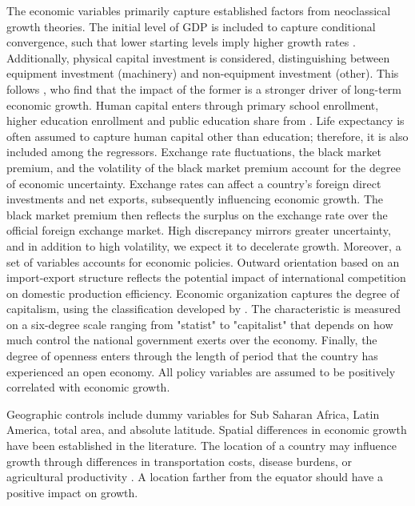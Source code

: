 \begin{subappendices}
The economic variables primarily capture established factors from neoclassical growth theories. The initial level of GDP is included to capture conditional convergence, such that lower starting levels imply higher growth rates \citep{BarroandMartin1992}. Additionally, physical capital investment is considered, distinguishing between equipment investment (machinery) and non-equipment investment (other). This follows \citet{DeLongandSummers1991}, who find that the impact of the former is a stronger driver of long-term economic growth. Human capital enters through primary school enrollment, higher education enrollment and public education share from \citet{Barro1996}. Life expectancy is often assumed to capture human capital other than education; therefore, it is also included among the regressors. Exchange rate fluctuations, the black market premium, and the volatility of the black market premium account for the degree of economic uncertainty. Exchange rates can affect a country's foreign direct investments and net exports, subsequently influencing economic growth. The black market premium then reflects the surplus on the exchange rate over the official foreign exchange market. High discrepancy mirrors greater uncertainty, and in addition to high volatility, we expect it to decelerate growth. Moreover, a set of variables accounts for economic policies. Outward orientation based on an import-export structure reflects the potential impact of international competition on domestic production efficiency. Economic organization captures the degree of capitalism, using the classification developed by \citet{HallJones1996}. The characteristic is measured on a six-degree scale ranging from "statist" to "capitalist" that depends on how much control the national government exerts over the economy. Finally, the degree of openness enters through the length of period that the country has experienced an open economy. All policy variables are assumed to be positively correlated with economic growth.

Geographic controls include dummy variables for Sub Saharan Africa, Latin America, total area, and absolute latitude. Spatial differences in economic growth have been established in the literature. The location of a country may influence growth through differences in transportation costs, disease burdens, or agricultural productivity \citep{GallupandSachs1999}. A location farther from the equator should have a positive impact on growth.


\end{subappendices}
